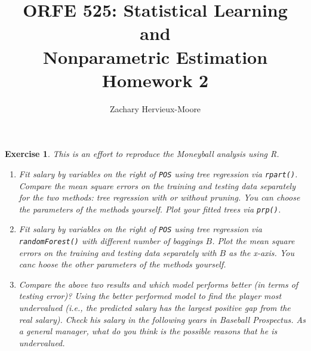 \documentclass[12pt]{article}
\title{ORFE 525: Statistical Learning and \\ Nonparametric Estimation \\ Homework 2}
\author{Zachary Hervieux-Moore}
\date{\displaydate{date}}
\theoremstyle{colon}
\newtheorem{exercise}{Exercise}
\begin{document}
\maketitle

\clearpage

\begin{exercise}
  This is an effort to reproduce the Moneyball analysis using R.
  \begin{enumerate}[label=\alph*)]
    \item Fit salary by variables on the right of \texttt{POS} using tree regression via \texttt{rpart()}. Compare the mean square errors on the training and testing data separately for the two methods: tree regression with or without pruning. You can choose the parameters of the methods yourself. Plot your fitted trees via \texttt{prp()}.
    \item Fit salary by variables on the right of \texttt{POS} using tree regression via \texttt{randomForest()} with different number of baggings $B$. Plot the mean square errors on the training and testing data separately with $B$ as the x-axis. You canc hoose the other parameters of the methods yourself.
    \item Compare the above two results and which model performs better (in terms of testing error)? Using the better performed model to find the player most undervalued (i.e., the predicted salary has the largest positive gap from the real salary). Check his salary in the following years in \textit{Baseball Prospectus}. As a general manager, what do you think is the possible reasons that he is undervalued.
  \end{enumerate}
\end{exercise}

\clearpage
\end{document}
